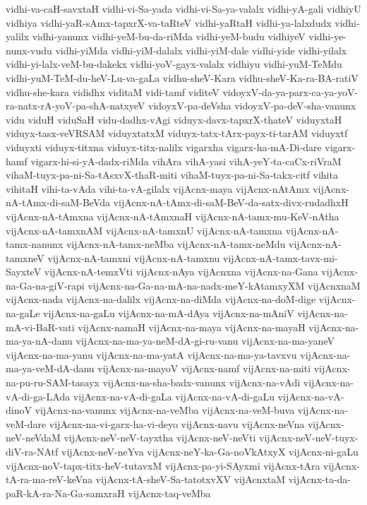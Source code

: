 {vidhi-va-caH-savxtaH
vidhi-vi-Sa-yada
vidhi-vi-Sa-ya-valalx
vidhi-yA-gali
vidhiyU
vidhiya
vidhi-yaR-sAmx-tapxrX-va-taRteV
vidhi-yaRtaH
vidhi-ya-lalxdudx
vidhi-yalilx
vidhi-yanunx
vidhi-yeM-bu-da-riMda
vidhi-yeM-budu
vidhiyeV
vidhi-ye-nunx-vudu
vidhi-yiMda
vidhi-yiM-dalalx
vidhi-yiM-dale
vidhi-yide
vidhi-yilalx
vidhi-yi-lalx-veM-bu-dakekx
vidhi-yoV-gayx-valalx
vidhiyu
vidhi-yuM-TeMdu
vidhi-yuM-TeM-du-heV-Lu-va-gaLa
vidhu-sheV-Kara
vidhu-sheV-Ka-ra-BA-ratiV
vidhu-she-kara
vididhx
viditaM
vidi-tamf
viditeV
vidoyxV-da-ya-parx-ca-ya-yoV-ra-natx-rA-yoV-pa-shA-natxyeV
vidoyxV-pa-deVsha
vidoyxV-pa-deV-sha-vanunx
vidu
viduH
viduSaH
vidu-dadhx-vAgi
viduyx-davx-tapxrX-thateV
viduyxtaH
viduyx-tasx-veVRSAM
viduyxtatxM
viduyx-tatx-tArx-payx-ti-tarAM
viduyxtf
viduyxti
viduyx-titxna
viduyx-titx-nalilx
vigarxha
vigarx-ha-mA-Di-dare
vigarx-hamf
vigarx-hi-si-yA-dadx-riMda
vihAra
vihA-yasi
vihA-yeY-ta-caCx-riVraM
vihaM-tuyx-pa-ni-Sa-tAsxvX-thaR-miti
vihaM-tuyx-pa-ni-Sa-takx-citf
vihita
vihitaH
vihi-ta-vAda
vihi-ta-vA-gilalx
vijAcnx-maya
vijAcnx-nAtAmx
vijAcnx-nA-tAmx-di-saM-BeVda
vijAcnx-nA-tAmx-di-saM-BeV-da-satx-divx-rudadhxH
vijAcnx-nA-tAmxna
vijAcnx-nA-tAmxnaH
vijAcnx-nA-tamx-mu-KeV-nAtha
vijAcnx-nA-tamxnAM
vijAcnx-nA-tamxnU
vijAcnx-nA-tamxna
vijAcnx-nA-tamx-nanunx
vijAcnx-nA-tamx-neMba
vijAcnx-nA-tamx-neMdu
vijAcnx-nA-tamxneV
vijAcnx-nA-tamxni
vijAcnx-nA-tamxnu
vijAcnx-nA-tamx-tavx-mi-SayxteV
vijAcnx-nA-temxVti
vijAcnx-nAya
vijAcnxna
vijAcnx-na-Gana
vijAcnx-na-Ga-na-giV-rapi
vijAcnx-na-Ga-na-mA-na-nadx-meY-kAtamxyXM
vijAcnxnaM
vijAcnx-nada
vijAcnx-na-dalilx
vijAcnx-na-diMda
vijAcnx-na-doM-dige
vijAcnx-na-gaLe
vijAcnx-na-gaLu
vijAcnx-na-mA-dAya
vijAcnx-na-mAniV
vijAcnx-na-mA-vi-BaR-vati
vijAcnx-namaH
vijAcnx-na-maya
vijAcnx-na-mayaH
vijAcnx-na-ma-ya-nA-danu
vijAcnx-na-ma-ya-neM-dA-gi-ru-vanu
vijAcnx-na-ma-yaneV
vijAcnx-na-ma-yanu
vijAcnx-na-ma-yatA
vijAcnx-na-ma-ya-tavxvu
vijAcnx-na-ma-ya-veM-dA-danu
vijAcnx-na-mayoV
vijAcnx-namf
vijAcnx-na-miti
vijAcnx-na-pu-ru-SAM-tasayx
vijAcnx-na-sha-badx-vanunx
vijAcnx-na-vAdi
vijAcnx-na-vA-di-ga-LAda
vijAcnx-na-vA-di-gaLa
vijAcnx-na-vA-di-gaLu
vijAcnx-na-vA-dinoV
vijAcnx-na-vanunx
vijAcnx-na-veMba
vijAcnx-na-veM-buva
vijAcnx-na-veM-dare
vijAcnx-na-vi-garx-ha-vi-deyo
vijAcnx-navu
vijAcnx-neVna
vijAcnx-neV-neVdaM
vijAcnx-neV-neV-tayxtha
vijAcnx-neV-neVti
vijAcnx-neV-neV-tuyx-diV-ra-NAtf
vijAcnx-neV-neYva
vijAcnx-neY-ka-Ga-noVkAtxyX
vijAcnx-ni-gaLu
vijAcnx-noV-tapx-titx-heV-tutavxM
vijAcnx-pa-yi-SAyxmi
vijAcnx-tAra
vijAcnx-tA-ra-ma-reV-keVna
vijAcnx-tA-sheV-Sa-tatotxvXV
vijAcnxtaM
vijAcnx-ta-da-paR-kA-ra-Na-Ga-samxraH
vijAcnx-taq-veMba
}
